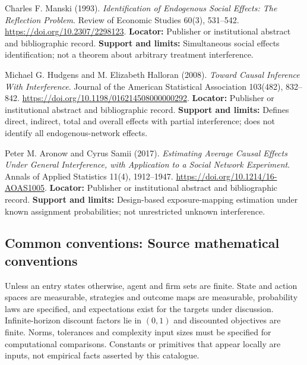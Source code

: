 \documentclass[11pt,a4paper]{article}
\begin{document}
\begin{enumerate}[label={[\textnormal{S}\arabic*]},leftmargin=*]

\item Charles F. Manski (1993). \emph{Identification of Endogenous Social Effects: The Reflection Problem}. Review of Economic Studies 60(3), 531–542. \url{https://doi.org/10.2307/2298123}. \textbf{Locator:} Publisher or institutional abstract and bibliographic record. \textbf{Support and limits:} Simultaneous social effects identification; not a theorem about arbitrary treatment interference.

\item Michael G. Hudgens and M. Elizabeth Halloran (2008). \emph{Toward Causal Inference With Interference}. Journal of the American Statistical Association 103(482), 832–842. \url{https://doi.org/10.1198/016214508000000292}. \textbf{Locator:} Publisher or institutional abstract and bibliographic record. \textbf{Support and limits:} Defines direct, indirect, total and overall effects with partial interference; does not identify all endogenous-network effects.

\item Peter M. Aronow and Cyrus Samii (2017). \emph{Estimating Average Causal Effects Under General Interference, with Application to a Social Network Experiment}. Annals of Applied Statistics 11(4), 1912–1947. \url{https://doi.org/10.1214/16-AOAS1005}. \textbf{Locator:} Publisher or institutional abstract and bibliographic record. \textbf{Support and limits:} Design-based exposure-mapping estimation under known assignment probabilities; not unrestricted unknown interference.

\end{enumerate}

\subsection*{Common conventions: Source mathematical conventions}

Unless an entry states otherwise, agent and firm sets are finite. State and action spaces are measurable, strategies and outcome maps are measurable, probability laws are specified, and expectations exist for the targets under discussion. Infinite-horizon discount factors lie in $(0,1)$ and discounted objectives are finite. Norms, tolerances and complexity input sizes must be specified for computational comparisons. Constants or primitives that appear locally are inputs, not empirical facts asserted by this catalogue.
\end{document}

